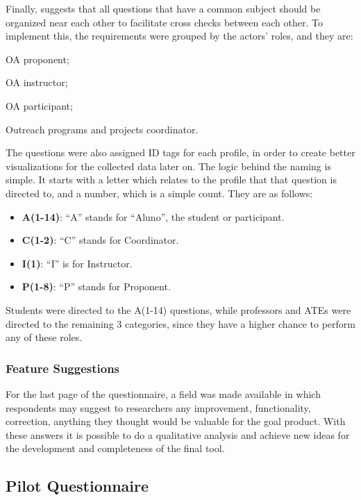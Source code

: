 Finally,  suggests that all questions that have a common subject should be organized near each other to facilitate cross checks between each other. To implement this, the requirements were grouped by the actors' roles, and they are:
\begin{inparaenum}[(1)]
  \item \ac{OA} proponent;
  \item \ac{OA} instructor;
  \item \ac{OA} participant;
  \item Outreach programs and projects coordinator.
\end{inparaenum}

The questions were also assigned \ac{ID} tags for each profile, in order to create better visualizations for the collected data later on. The logic behind the naming is simple. It starts with a letter which relates to the profile that that question is directed to, and a number, which is a simple count. They are as follows:
\begin{itemize}
  \item \textbf{A(1-14)}: ``A'' stands for ``Aluno'', the student or participant.
  \item \textbf{C(1-2)}: ``C'' stands for Coordinator.
  \item \textbf{I(1)}: ``I'' is for Instructor.
  \item \textbf{P(1-8)}: ``P'' stands for Proponent.
\end{itemize}
Students were directed to the A(1-14) questions, while professors and \acp{ATE} were directed to the remaining 3 categories, since they have a higher chance to perform any of these roles.

\subsubsection{Feature Suggestions}

For the last page of the questionnaire, a field was made available in which respondents may suggest to researchers any improvement, functionality, correction, anything they thought would be valuable for the goal product. With these answers it is possible to do a qualitative analysis and achieve new ideas for the development and completeness of the final tool.

\subsection{Pilot Questionnaire}\label{sec:survey-pilot}

